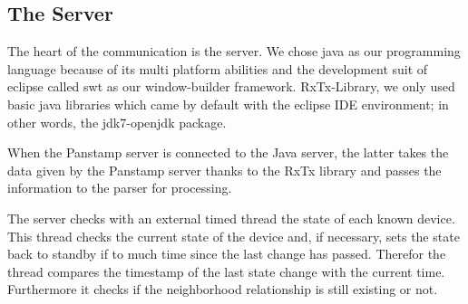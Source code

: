\subsection{The Server}
The heart of the communication is the server. We chose java\cite{java} as our
programming language because of its multi platform abilities and the development
suit of eclipse\cite{eclipse} called swt\cite{swt} as our window-builder
framework.%
RxTx-Library\cite{rxtx}, we only used basic java libraries which came by default
with the eclipse IDE\cite{ide} environment; in other words, the
jdk7-openjdk\cite{open_jdk} package. %

When the Panstamp server is connected to the Java server, the latter takes the data given by the Panstamp server thanks to the RxTx library \cite{rxtx} and passes the information to the parser for processing. %


The server checks with an external timed thread the state of each known device.
This thread checks the current state of the device and, if necessary, sets the
state back to standby if to much time since the last change has passed. Therefor
the thread compares the timestamp of the last state change with the current
time. Furthermore it checks if the neighborhood relationship is still existing
or not.

